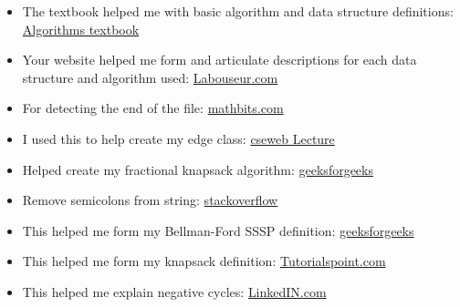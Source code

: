 \documentclass[letterpaper, 10pt,DIV=13]{scrartcl}
\numberwithin{equation}{section} %
\numberwithin{figure}{section} %
\numberwithin{table}{section} %
\begin{document}
\begin{itemize}
    \item The textbook helped me with basic algorithm and data structure definitions: \href{http://jeffe.cs.illinois.edu/teaching/algorithms/book/Algorithms-JeffE.pdf}{Algorithms textbook}

    \item Your website helped me form and articulate descriptions for each data structure and algorithm used: \href{https://www.labouseur.com/courses/algorithms/}{Labouseur.com}
    
    \item For detecting the end of the file: \href{https://mathbits.com/MathBits/CompSci/Files/End.htm#:~:text=C%2B%2B%20provides%20a%20special%20function,from%20an%20input%20file%20stream.}{mathbits.com}

    \item I used this to help create my edge class: \href{https://cseweb.ucsd.edu/~kube/cls/100/Lectures/lec11/lec11-16.html}{cseweb Lecture}

    \item Helped create my fractional knapsack algorithm: \href{https://www.geeksforgeeks.org/c-program-for-the-fractional-knapsack-problem/}{geeksforgeeks}

    \item Remove semicolons from string: \href{https://stackoverflow.com/questions/2684491/remove-commas-from-string}{stackoverflow}

    \item This helped me form my Bellman-Ford SSSP definition: 
    \href{https://www.geeksforgeeks.org/bellman-ford-algorithm-dp-23/}{geeksforgeeks}

    \item This helped me form my knapsack definition: 
    \href{https://www.tutorialspoint.com/design_and_analysis_of_algorithms/design_and_analysis_of_algorithms_fractional_knapsack.htm#:~:text=The%20knapsack%20problem%20states%20that,total%20profit%20value%20is%20maximum.}{Tutorialspoint.com}

    \item This helped me explain negative cycles: 
    \href{https://www.linkedin.com/advice/0/how-do-you-handle-negative-cycles-weights-graph#:~:text=Negative%20cycles%20are%20loops%20in,profit%20by%20repeating%20the%20cycle.}{LinkedIN.com}


    
\end{itemize}

\pagebreak

% 
\end{document}
